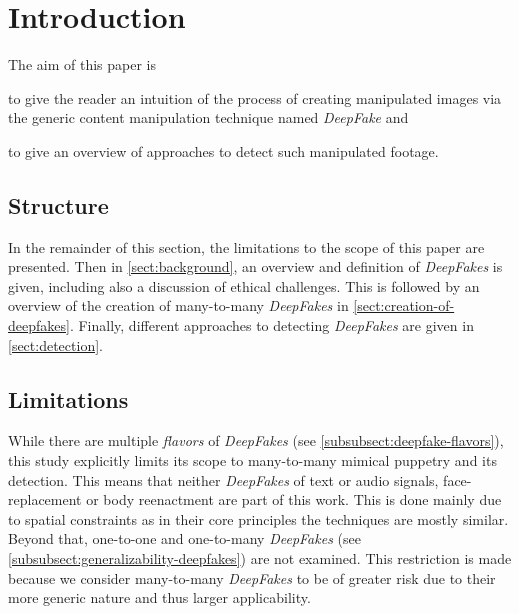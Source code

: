 \section{Introduction}
The aim of this paper is
\begin{enumerate*}[a.)]
    \item to give the reader an intuition of the process of creating manipulated
    images via the generic content manipulation technique named \textit{DeepFake}
    and
    \item to give an overview of approaches to detect such manipulated footage.
\end{enumerate*}

\subsection{Structure}
In the remainder of this section, the limitations to the scope of this paper are
presented. Then in \cref{sect:background}, an overview and definition of \textit{DeepFakes}
is given, including also a discussion of ethical challenges.
This is followed by an overview of the creation of many-to-many \textit{DeepFakes}
in \cref{sect:creation-of-deepfakes}. Finally, different approaches to detecting
\textit{DeepFakes} are given in \cref{sect:detection}.

\subsection{Limitations}\label{subsect:limitations}
While there are multiple \textit{flavors} of \textit{DeepFakes} (see \cref{subsubsect:deepfake-flavors}),
this study explicitly limits its scope to many-to-many mimical puppetry and its
detection. This means that neither \textit{DeepFakes} of text or audio signals,
face-replacement or body reenactment are part of this work. This is done mainly
due to spatial constraints as in their core principles the techniques are mostly
similar. Beyond that, one-to-one and one-to-many \textit{DeepFakes} (see \cref{subsubsect:generalizability-deepfakes})
are not examined. This restriction is made because we consider many-to-many \textit{DeepFakes}
to be of greater risk due to their more generic nature and thus larger applicability.